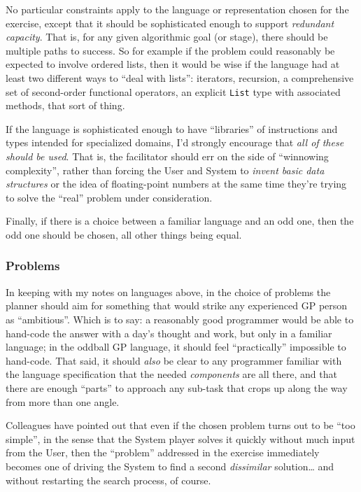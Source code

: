 No particular constraints apply to the language or representation chosen for the exercise, except that it should be sophisticated enough to support \emph{redundant capacity}. That is, for any given algorithmic goal (or stage), there should be multiple paths to success.  So for example if the problem could reasonably be expected to involve ordered lists, then it would be wise if the language had at least two different ways to ``deal with lists'': iterators, recursion, a comprehensive set of second-order functional operators, an explicit {\tt List} type with associated methods, that sort of thing.

If the language is sophisticated enough to have ``libraries'' of instructions and types intended for specialized domains, I'd strongly encourage that \emph{all of these should be used}. That is, the facilitator should err on the side of ``winnowing complexity'', rather than forcing the User and System to \emph{invent basic data structures} or the idea of floating-point numbers at the same time they're trying to solve the ``real'' problem under consideration.

Finally, if there is a choice between a familiar language and an odd one, then the odd one should be chosen, all other things being equal.

\subsubsection{Problems}\hypertarget{problems}{}\label{problems}

In keeping with my notes on languages above, in the choice of problems the planner should aim for something that would strike any experienced GP person as ``ambitious''. Which is to say: a reasonably good programmer would be able to hand-code the answer with a day's thought and work, but only in a familiar language; in the oddball GP language, it should feel ``practically'' impossible to hand-code. That said, it should \emph{also} be clear to any programmer familiar with the language specification that the needed \emph{components} are all there, and that there are enough ``parts'' to approach any sub-task that crops up along the way from more than one angle.

Colleagues have pointed out that even if the chosen problem turns out to be ``too simple'', in the sense that the System player solves it quickly without much input from the User, then the ``problem'' addressed in the exercise immediately becomes one of driving the System to find a second \emph{dissimilar} solution\ldots{} and without restarting the search process, of course.

